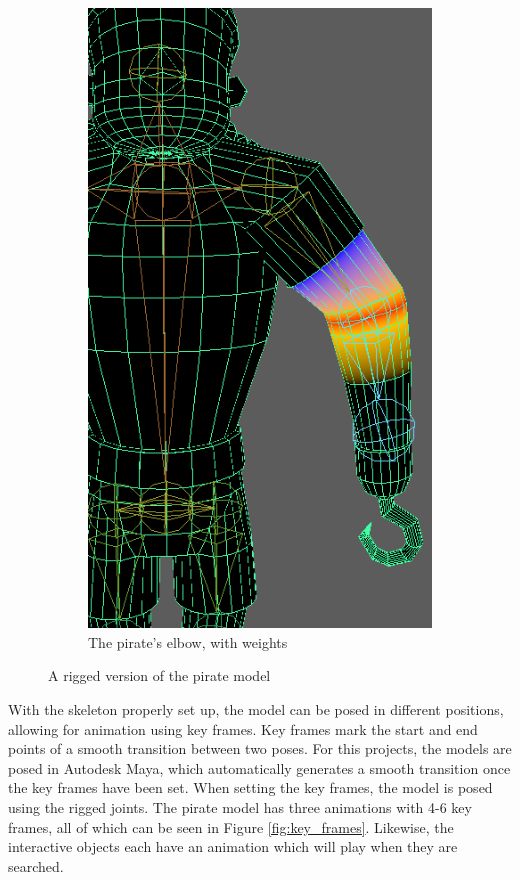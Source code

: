 \begin{figure}[h!]
\begin{subfigure}[b]{0.45\textwidth}
		\includegraphics[scale=0.6]{figures/elbow_pirate.png}
		\caption{The pirate's elbow, with weights}
		\label{fig:elbow_pirate}
	\end{subfigure}
	\caption{A rigged version of the pirate model}
	\label{fig:riggin}
\end{figure}

With the skeleton properly set up, the model can be posed in different positions, allowing for animation using key frames. Key frames mark the start and end points of a smooth transition between two poses. For this projects, the models are posed in Autodesk Maya, which automatically generates a smooth transition once the key frames have been set. When setting the key frames, the model is posed using the rigged joints. The pirate model has three animations with 4-6 key frames, all of which can be seen in Figure \ref{fig:key_frames}. Likewise, the interactive objects each have an animation which will play when they are searched.

